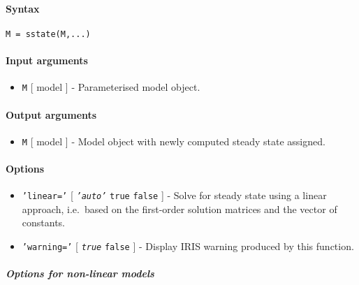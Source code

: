 


	\paragraph{Syntax}\label{syntax}

\begin{verbatim}
M = sstate(M,...)
\end{verbatim}

\paragraph{Input arguments}\label{input-arguments}

\begin{itemize}
\itemsep1pt\parskip0pt
\item
  \texttt{M} {[} model {]} - Parameterised model object.
\end{itemize}

\paragraph{Output arguments}\label{output-arguments}

\begin{itemize}
\itemsep1pt\parskip0pt
\item
  \texttt{M} {[} model {]} - Model object with newly computed steady
  state assigned.
\end{itemize}

\paragraph{Options}\label{options}

\begin{itemize}
\item
  \texttt{'linear='} {[} \emph{\texttt{'auto'}} \textbar{} \texttt{true}
  \textbar{} \texttt{false} {]} - Solve for steady state using a linear
  approach, i.e.~based on the first-order solution matrices and the
  vector of constants.
\item
  \texttt{'warning='} {[} \emph{\texttt{true}} \textbar{} \texttt{false}
  {]} - Display IRIS warning produced by this function.
\end{itemize}

\subparagraph{Options for non-linear
models}\label{options-for-non-linear-models}

